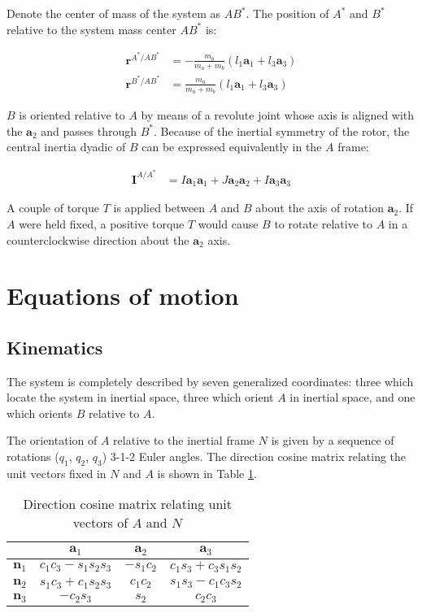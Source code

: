\documentclass[letterpaper,11pt]{article}
\newcommand{\bs}[1]{ \boldsymbol{ #1 } }
\begin{document}
Denote the center of mass of the system as $AB^*$. The position of $A^*$ and
$B^*$ relative to the system mass center $AB^*$ is:

\begin{align*}
  \bs{r}^{A^* / AB^*} & = -\frac{m_b}{m_a+m_b}(l_1 \bs{a}_1 + l_3 \bs{a}_3) \\
  \bs{r}^{B^* / AB^*} & =  \frac{m_a}{m_a+m_b}(l_1 \bs{a}_1 + l_3 \bs{a}_3)
\end{align*}

$B$ is oriented relative to $A$ by means of a revolute joint whose axis is
aligned with the $\bs{a}_2$ and passes through $B^*$.  Because of the inertial
symmetry of the rotor, the central inertia dyadic of $B$ can be expressed
equivalently in the $A$ frame:

\begin{align*}
  \bs{I}^{A/A^*} & = I\bs{a}_1\bs{a}_1 + J\bs{a}_2\bs{a}_2 + I\bs{a}_3\bs{a}_3
\end{align*}

A couple of torque $T$ is applied between $A$ and $B$ about the axis of
rotation $\bs{a}_2$.  If $A$ were held fixed, a positive torque $T$ would cause
$B$ to rotate relative to $A$ in a counterclockwise direction about the
$\bs{a}_2$ axis.

\section*{Equations of motion}
\subsection*{Kinematics}

The system is completely described by seven generalized coordinates: three
which locate the system in inertial space, three which orient $A$ in inertial
space, and one which orients $B$ relative to $A$.

The orientation of $A$ relative to the inertial frame $N$ is given by a
sequence of rotations ($q_1$, $q_2$, $q_3$) 3-1-2 Euler angles.  The direction
cosine matrix relating the unit vectors fixed in $N$ and $A$ is shown in Table
\ref{directioncosines}.

\begin{table}[!h]
  \begin{center}
    \begin{tabular}{l|ccc}
      & $\bs{a}_1$ & $\bs{a}_2$ & $\bs{a}_3$ \\
      \hline
      $\bs{n}_1$ & $c_1c_3 - s_1s_2s_3$ & $-s_1c_2$ & $c_1s_3 + c_3s_1s_2$ \\
      $\bs{n}_2$ & $s_1c_3 + c_1s_2s_3$ & $ c_1c_2$& $s_1s_3 - c_1c_3s_2$ \\
      $\bs{n}_3$ & $-c_2s_3$ & $s_2$& $c_2c_3$
    \end{tabular}
  \end{center}
  \caption{Direction cosine matrix relating unit vectors of $A$ and $N$}
  \label{directioncosines}
\end{table}
\end{document}
